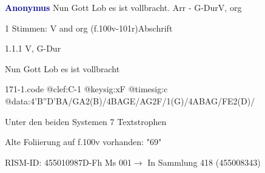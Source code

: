 \documentclass[twocolumn, 12pt]{book}
\begin{document}
\par \vspace{16pt} \textcolor{darkblue}{\textbf{Anonymus  }}\hfillplus{\textbf{[171]}}\newline Nun Gott Lob es ist vollbracht. Arr - G-Dur\newline V, org
\par \begin{itshape}\end{itshape} 
\par \textcolor{darkblue}{}  1 Stimmen: V and org  (f.100v-101r)\newline Abschrift
\par 1.1.1  V, G-Dur\newline \begin{footnotesize} Nun Gott Lob es ist vollbracht \end{footnotesize}  
\begin{filecontents*}{171-1.code}
@clef:C-1
@keysig:xF
@timesig:c
@data:4'B''D'BA/GA2(B)/4BAGE/AG2F/1(G)/4ABAG/FE2(D)/
\end{filecontents*}
\newline %
\par Unter den beiden Systemen 7 Textstrophen
\par Alte Foliierung auf f.100v vorhanden: "69"
\par RISM-ID: 455010987\newline D-Fh  Ms 001\newline $\rightarrow$ In Sammlung 418 (455008343)
      
\end{document}
